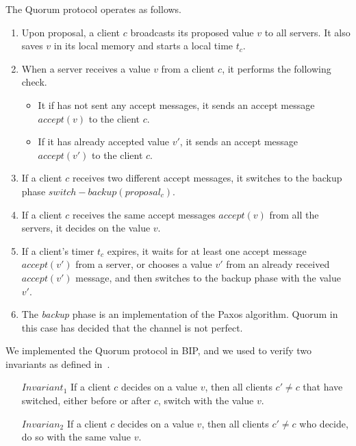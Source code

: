 The Quorum protocol operates as follows.
\begin{enumerate}
 \item Upon proposal, a client $c$ broadcasts its proposed value 
 $v$ to all servers. It also saves $v$ in its local memory and starts a local time
 $t_c$. 
 \item When a server receives a value $v$ from a client $c$, it performs
 the following check.
 \begin{itemize}
  \item It if has not sent any accept messages, it sends an accept message
  $accept(v)$ to the client $c$. 
  \item If it has already accepted value $v'$, it sends an accept message
  $accept(v')$ to the client $c$. 
 \end{itemize}
 \item If a client $c$ receives two different accept messages, it switches
 to the backup phase $switch-backup(proposal_c)$.
 \item If a client $c$ receives the same accept messages $accept(v)$ from all the servers,
 it decides on the value $v$.
 \item If a client's timer $t_c$ expires, it waits for at least
 one accept message $accept(v')$ from a server, or chooses a value $v'$
 from an already received $accept(v')$ message, and then switches to 
 the backup phase with the value $v'$. 
 \item The {\em backup} phase is an implementation of the Paxos algorithm. Quorum in this
 case has decided that the channel is not perfect. 
\end{enumerate}

We implemented the Quorum protocol in BIP, and we used \biptool{} to verify 
two invariants as defined in~\cite{guerraoui2012speculative}.
\begin{enumerate}
 \item[$Invariant_1$] If a client $c$ decides on a value $v$, then all clients 
 $c' \neq c$ that have switched, either before or after $c$, switch with the value $v$.
 \item[$Invarian_2$] If a client $c$ decides on a value $v$, then all clients
 $c' \neq c$ who decide, do so with the same value $v$. 
\end{enumerate}

